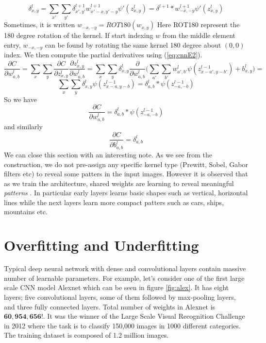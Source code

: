\documentclass[12pt]{article}
\begin{document}
\begin{equation}
\label{eq:cnnE2}
\delta_{x,y}^{l} =  \sum\limits_{x'} \sum\limits_{y'} \delta_{x',y'}^{l+1} w_{x'-x,y'-y}^{l+1}\psi'(z_{x,y}^{l}) = 
\delta^{l+1}*w_{-x,-y}^{l+1} \psi'(z_{x,y}^{l})
\end{equation}
Sometimes, it is written $w_{-x,-y}= ROT180(w_{x,y})$ Here ROT180 represent the 180 degree rotation of the kernel. If start indexing $w$ from the middle element entry, $w_{-x,-y}$ can be found by rotating the same kernel 180 degree about $(0,0)$ index. We then compute the partial derivatives using (\ref{eq:cnnE2}).
$$
 \dfrac{\partial C}{\partial w_{a,b}^{l}} =  \sum\limits_{x} \sum\limits_{y} \dfrac{\partial C}{\partial z_{x,y}^{l}} \dfrac{\partial z_{x,y}^{l}}{\partial w_{a,b}^{l}} 
=
\sum\limits_{x} \sum\limits_{y} \delta_{x,y}^{l} \dfrac{\partial }{\partial w_{a,b}^{l}} 
\Big( \sum\limits_{a'} \sum\limits_{b'} w_{a',b'}^{l}\psi(z_{x-a',y-b'}^{l-1})+b_{x,y}^{l} \Big)
= 
$$
$$\sum\limits_{x} \sum\limits_{y} \delta_{x,y}^{l} \psi(z_{x-a,y-b}^{l-1}) = \delta_{a,b}^{l}*\psi(z_{-a,-b}^{l-1})$$
So we have 
\begin{equation}
\label{eq:cnnE3}
 \dfrac{\partial C}{\partial w_{a,b}^{l}}  = \delta_{a,b}^{l}*\psi(z_{-a,-b}^{l-1})
\end{equation}
and similarly 
\begin{equation}
\label{eq:cnnE4}
 \dfrac{\partial C}{\partial b_{a,b}^{l}}  = \delta_{a,b}^{l}
\end{equation}
We can close this section with an interesting note. As we see from the construction, we do not pre-assign any specific kernel type (Prewitt, Sobel, Gabor filters etc) to reveal some patters in the input images. However it is observed that as we train the architecture, shared weights are learning to reveal meaningful \textit{patterns }. In particular early layers learns basic shapes such as vertical, horizontal lines while the next layers learn more compact patters such as cars, ships, mountains etc.

\section{Overfitting and Underfitting}
\label{sec:overunder}

Typical deep neural network with dense and convolutional layers contain massive number of learnable parameters. For example, let's consider one of the first large scale CNN model Alexnet \cite{alexnet} which can be seen in figure \ref{fig:alex}. It has eight layers; five convolutional layers, some of them followed by max-pooling layers, and three fully connected layers. Total number of weights in Alexnet is $\mathbf{60,954,656!}$. It was the winner of the Large Scale Visual Recognition Challenge in 2012 \cite{imagenet} where the task is to classify 150,000 images in 1000 different categories. The training dataset is composed of 1.2 million images. 
\end{document}
